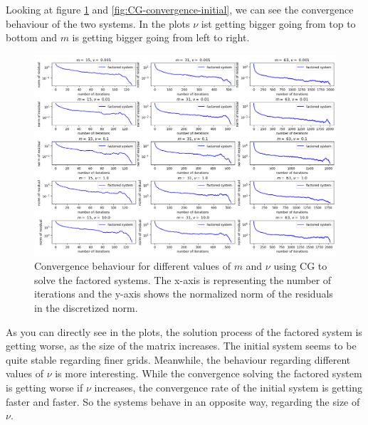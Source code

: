 \documentclass{amsart}
\theoremstyle{definition}
\theoremstyle{remark}
\numberwithin{equation}{section}
\begin{document}
Looking at figure \ref{fig:CG-convergence-factored} and \ref{fig:CG-convergence-initial}, we can see the  convergence behaviour of the two systems. In the plots $\nu$ ist getting bigger going from top to bottom and $m$ is getting bigger going from left to right.
\begin{figure}[h!]
\centering
\includegraphics[scale=0.52]{./imgs/CG_analysis_factored}
\caption{Convergence behaviour for different values of $m$ and $\nu$ using CG to solve the factored systems.
The x-axis is representing the number of iterations and the y-axis shows the normalized norm of the residuals in the discretized norm.}
\label{fig:CG-convergence-factored}
\end{figure}
As you can directly see in the plots, the solution process of the factored system is getting worse, as the size of the matrix increases. The initial
system seems to be quite stable regarding finer grids. Meanwhile, the behaviour  regarding different values of $\nu$ is more interesting. While the 
convergence solving the factored system is getting worse if 
$\nu$ increases, the convergence rate of the initial system is getting faster and faster. So the systems behave in an opposite way, regarding the size of 
$\nu$.
\end{document}
